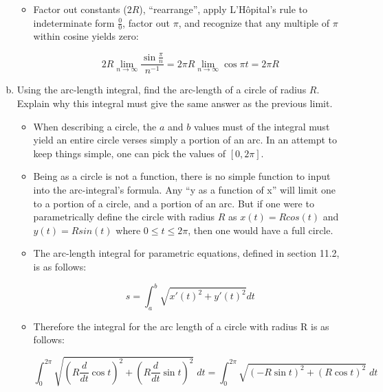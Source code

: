 \documentclass[11pt]{article}
\begin{document}
\begin{enumerate}[a)]
		\begin{itemize}
		
			\item Factor out constants ($2R$), ``rearrange'', apply 
			L'H\^{o}pital's rule to indeterminate form $\frac{0}{0}$, 
			factor out $\pi$, and recognize that any multiple of $\pi$ 
			within cosine yields zero:
			
			\begin{equation*}
				2 R \lim_{n \to \infty} \frac{\sin\frac{\pi}{n}}{n^{-1}} = 
				2 \pi R \lim_{n \to \infty} \cos\pi t = 2 \pi R
			\end{equation*}
		
		\end{itemize}
	
	\item Using the arc-length integral, find the arc-length of a circle of radius $R$.
	Explain why this integral must give the same answer as the previous limit.

		\begin{itemize}
		
		\item When describing a circle, the $a$ and $b$ values must of 
			the integral must yield an entire circle verses simply a portion
			of an arc. In an attempt to keep things simple, one can pick the values
			of $[0, 2\pi]$.
			
			\item Being as a circle is not a function, there is no simple function
			to input into the arc-integral's formula. Any ``y as a function of x''
			will limit one to a portion of a circle, and a portion of an arc. 
			But if one were to parametrically define the circle with radius $R$ as
			$x(t) = Rcos(t)$ and $y(t) = Rsin(t)$ where $0 \le t \le 2\pi$, 
			then one would have a full circle.
			
			\item The arc-length integral for parametric equations, defined in 
			section 11.2, is as follows:
			
			\begin{equation*}
				s = \int_a^b \sqrt{x'(t)^2 + y'(t)^2}dt
			\end{equation*}
			
			\item Therefore the integral for the arc length of a circle with radius R is
			as follows:
			
			\begin{equation*}
			\int_0^{2\pi}\sqrt{(R \frac{d}{dt}\cos t)^2+(R \frac{d}{dt}\sin t)^2}\;dt
		=	\int_0^{2\pi}\sqrt{(-R \sin t)^2+(R \cos t)^2}\;dt
			\end{equation*}
			

\end{itemize}
\end{enumerate}
\end{document}
